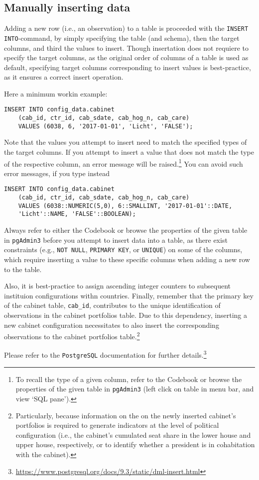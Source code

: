 \subsection{Manually inserting data}\label{subsec_manually_inserting_data}

Adding a new row (i.e., an observation) to a table is proceeded with the \texttt{INSERT INTO}-command, by simply specifying the table (and schema), then the target columns, and third the values to insert.
Though insertation does not requiere to specify the target columns, as the original order of columns of a table is used as default, specifying target columns corresponding to insert values is best-practice, as it ensures a correct insert operation.

Here a minimum workin example:
\begin{lstlisting}[language=postgreSQL]
INSERT INTO config_data.cabinet
	(cab_id, ctr_id, cab_sdate, cab_hog_n, cab_care)
	VALUES (6038, 6, '2017-01-01', 'Licht', 'FALSE');
\end{lstlisting}
Note that the values you attempt to insert need to match the specified types of the target columns. 
If you attempt to insert a value that does not match the type of the respective column, an error message will be raised.\footnote{%
To recall the type of a given column, refer to the Codebook or browse the properties of the given table in \texttt{pgAdmin3} (left click on table in menu bar, and view `SQL pane').}
You can avoid such error messages, if you type instead 
\begin{lstlisting}[language=postgreSQL]
INSERT INTO config_data.cabinet
	(cab_id, ctr_id, cab_sdate, cab_hog_n, cab_care)
	VALUES (6038::NUMERIC(5,0), 6::SMALLINT, '2017-01-01'::DATE, 
    'Licht'::NAME, 'FALSE'::BOOLEAN);
\end{lstlisting}

Always refer to either the Codebook or browse the properties of the given table in \texttt{pgAdmin3} before you attempt to insert data into a table, as there exist constraints (e.g., \texttt{NOT NULL}, \texttt{PRIMARY KEY}, or \texttt{UNIQUE}) on some of the columns, which require inserting a value to these specific columns when adding a new row to the table.

Also, it is best-practice to assign ascending integer counters  to subsequent instituion configurations withn countries.
Finally, remember that the primary key of the cabinet table, \texttt{cab\_id}, contributes to the unique identification of observations in the cabinet portfolios table. 
Due to this dependency, inserting a new cabinet configuration necessitates to also insert the corresponding observations to the cabinet portfolios table.\footnote{%
Particularly, because information on the on the newly inserted cabinet's portfolios is required to generate indicators at the level of political configuration (i.e., the cabinet's cumulated seat share in the lower house and upper house, respectively, or to identify whether a president is in cohabitation with the cabinet).}

Please refer to the \texttt{PostgreSQL} documentation for further details.\footnote{\url{https://www.postgresql.org/docs/9.3/static/dml-insert.html}}
